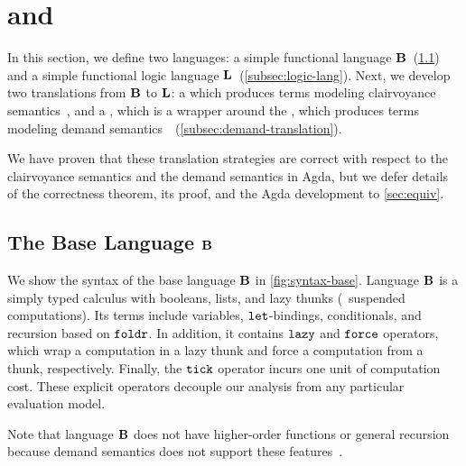 \section{\TransCname{} and \TransDname}\label{sec:translation}

In this section, we define two languages: a simple functional language
\(\mathbf{B}\)~(\cref{subsec:base-lang}) and a simple functional logic language
\(\mathbf{L}\)~(\cref{subsec:logic-lang}). Next, we develop two translations from \(\mathbf{B}\) to \(\mathbf{L}\): a
\emph{\transCname} which produces terms modeling clairvoyance
semantics~\cite{clairvoyant,forking-paths}, and a \emph{\transDname}, which is a
wrapper around the \transCname, which produces terms modeling demand
semantics~\cite{bjerner1989,demand-semantics}~(\cref{subsec:demand-translation}).

\ifextended
We have proven that these translation strategies are correct with respect to the
clairvoyance semantics and the demand semantics in Agda, but we defer details of
the correctness theorem, its proof, and the Agda development to
\cref{sec:equiv}.
\fi

\subsection{The Base Language \(\mathbf{B}\)}\label{subsec:base-lang}

We show the syntax of the base language \(\mathbf{B}\) in \cref{fig:syntax-base}.
Language \(\mathbf{B}\) is a simply typed calculus with booleans, lists, and lazy
thunks (\ie~suspended computations). Its terms include variables,
\(\texttt{let}\)-bindings, conditionals, and recursion based on \(\texttt{foldr}\). In
addition, it contains \( \texttt{lazy} \) and \( \texttt{force} \) operators, which wrap a
computation in a lazy thunk and force a computation from a thunk,
respectively.
Finally, the \( \texttt{tick} \) operator incurs one unit of computation cost. These
explicit operators decouple our analysis from any particular evaluation model.

Note that language \(\mathbf{B}\) does not have higher-order functions or general recursion
because demand semantics does not support these
features~\cite{bjerner1989,demand-semantics}.

